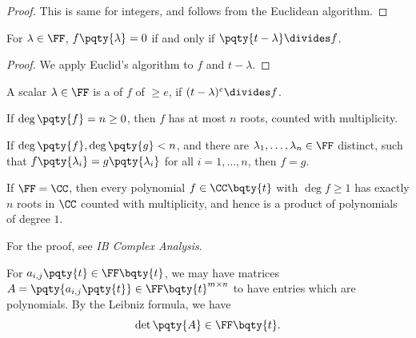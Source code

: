\begin{proof}
    This is same for integers, and follows from the Euclidean algorithm.
\end{proof}

\begin{lemma}
    For \(\lambda \in \FF\), \(f\pqty{\lambda} = 0\) if and only if \(\pqty{t - \lambda} \divides f\).
\end{lemma}

\begin{proof}
    We apply Euclid's algorithm to \(f\) and \(t - \lambda\).
\end{proof}

\begin{definition}
    A scalar \(\lambda \in \FF\) is a  of \(f\) of  \(\geq e\), if \((t - \lambda)^e \divides f\).
\end{definition}

\begin{corollary}
    If \(\deg \pqty{f} = n \geq 0\), then \(f\) has at most \(n\) roots, counted with multiplicity.
\end{corollary}

\begin{corollary}
    If \(\deg\pqty{f}, \deg\pqty{g} < n\), and there are \(\lambda_1, \ldots, \lambda_n \in \FF\) distinct, such that \(f\pqty{\lambda_i} = g\pqty{\lambda_i}\) for all \(i = 1, \ldots, n\), then \(f = g\).
\end{corollary}

\begin{theorem}
    \label{thm:fundamental-theorem-of-algebra}%
    If \(\FF = \CC\), then every polynomial \(f \in \CC\bqty{t}\) with \(\deg f \geq 1\) has exactly \(n\) roots in \(\CC\) counted with multiplicity, and hence is a product of polynomials of degree \(1\).
\end{theorem}

For the proof, see \textit{IB Complex Analysis}.

For \(a_{i, j} \pqty{t} \in \FF\bqty{t}\), we may have matrices \(A = \pqty{a_{i, j}\pqty{t}} \in \FF\bqty{t}^{m \times n}\) to have entries which are polynomials. By the Leibniz formula, we have
\[
    \det\pqty{A} \in \FF\bqty{t}.
\]